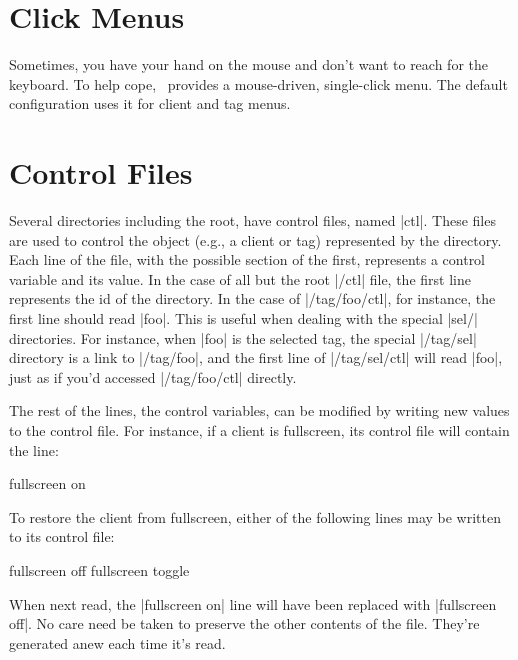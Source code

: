 \section{Click Menus}

Sometimes, you have your hand on the mouse and don't want to
reach for the keyboard. To help cope, \wmii\ provides a
mouse-driven, single-click menu. The default configuration uses
it for client and tag menus.


\section{Control Files}

\label{sec:controlfiles}

Several directories including the root, have control files,
named |ctl|. These files are used to control the object (e.g., a
client or tag) represented by the directory. Each line of the
file, with the possible section of the first, represents a
control variable and its value. In the case of all but the root
|/ctl| file, the first line represents the id of the directory.
In the case of |/tag/foo/ctl|, for instance, the first line
should read |foo|. This is useful when dealing with the special
|sel/| directories. For instance, when |foo| is the selected
tag, the special |/tag/sel| directory is a link to |/tag/foo|,
and the first line of |/tag/sel/ctl| will read |foo|, just as
if you'd accessed |/tag/foo/ctl| directly.

The rest of the lines, the control variables, can be modified by
writing new values to the control file. For instance, if a
client is fullscreen, its control file will contain the line:

\begin{code}
  fullscreen on
\end{code}

\noindent To restore the client from fullscreen, either of the
following lines may be written to its control file:

\begin{code}
  fullscreen off
  fullscreen toggle
\end{code}

When next read, the |fullscreen on| line will have been replaced
with |fullscreen off|.  No care need be taken to preserve the
other contents of the file. They're generated anew each time
it's read.

